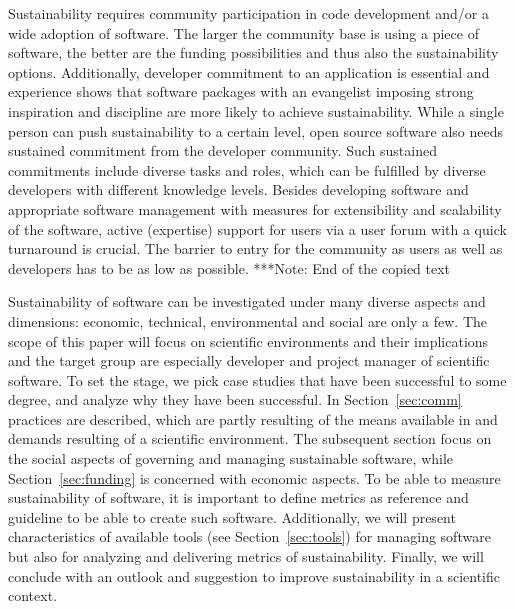 \documentclass[11pt, oneside]{amsart}
\newcommand{\note}[1]{ {\textcolor{blueish}    { ***Note:      #1 }}}
\begin{document}
Sustainability requires community participation in code development and/or a
wide adoption of software. The larger the community base is using a piece of
software, the better are the funding possibilities and thus also the
sustainability options. Additionally, developer commitment to an application is
essential and experience shows that software packages with an evangelist
imposing strong inspiration and discipline are more likely to achieve
sustainability. While a single person can push sustainability to a certain
level, open source software also needs sustained commitment from the developer
community. Such sustained commitments include diverse tasks and roles, which can
be fulfilled by diverse developers with different knowledge levels. Besides
developing software and appropriate software management with measures for
extensibility and scalability of the software, active (expertise) support for
users via a user forum with a quick turnaround is crucial. The barrier to entry
for the community as users as well as developers has to be as low as possible.
\note{End of the copied text}

Sustainability of software can be investigated under many diverse aspects and dimensions: 
economic, technical, environmental and social are only a few. The scope of this paper will focus 
on scientific environments and their implications and the target group are especially developer 
and project manager of scientific software. To set the stage, we pick case studies that have been 
successful to some degree, and analyze why they have been successful. In Section~\ref{sec:comm}  
practices are described, which are partly resulting of the means available in and demands resulting of a scientific environment. 
The subsequent section focus on the social aspects of governing and managing sustainable software, 
while Section~\ref{sec:funding} is concerned with economic aspects. To be able to measure sustainability of 
software, it is important to define metrics as reference and guideline to be able to create such 
software. Additionally, we will present characteristics of available tools (see Section~\ref{sec:tools}) 
for managing software but also for analyzing and delivering metrics of sustainability. Finally, 
we will conclude with an outlook and suggestion to improve sustainability in a scientific context.  









\end{document}
